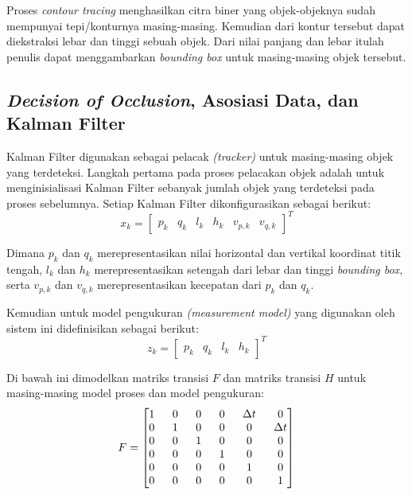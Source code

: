         Proses \textit{contour tracing} menghasilkan citra biner yang objek-objeknya sudah mempunyai tepi/konturnya masing-masing. Kemudian dari kontur tersebut dapat diekstraksi lebar dan tinggi sebuah objek. Dari nilai panjang dan lebar  itulah penulis dapat menggambarkan \textit{bounding box} untuk masing-masing objek tersebut.
        
    \subsection{\textit{Decision of Occlusion}, Asosiasi Data, dan Kalman Filter }
        Kalman Filter digunakan sebagai pelacak \textit{(tracker)} untuk masing-masing objek yang terdeteksi. Langkah pertama pada proses pelacakan objek adalah untuk menginisialisasi Kalman Filter sebanyak jumlah objek yang terdeteksi pada proses sebelumnya. Setiap Kalman Filter dikonfigurasikan sebagai berikut:
        \begin{equation}\label{eq:3.1}
        x_k = 
        \begin{bmatrix}
        p_k & q_k & l_k & h_k & v_{p, k} & v_{q, k}
        \end{bmatrix}^T
        \end{equation}
        
        Dimana $p_{k}$ dan $q_{k}$ merepresentasikan nilai horizontal dan vertikal koordinat titik tengah, $l_k$ dan $h_k$ merepresentasikan setengah dari lebar dan tinggi \textit{bounding box}, serta $v_{p, k}$ dan $v_{q, k}$ merepresentasikan kecepatan dari $p_{k}$ dan $q_{k}$.
        
        Kemudian untuk model pengukuran \textit{(measurement model)} yang digunakan oleh sistem ini didefinisikan sebagai berikut:
        \begin{equation}\label{eq:3.2}
        z_k = 
        \begin{bmatrix}
        p_k & q_k & l_k & h_k
        \end{bmatrix}^T
        \end{equation}
        
        Di bawah ini dimodelkan matriks transisi $F$ dan matriks transisi $H$ untuk masing-masing model proses dan model pengukuran:
        \begin{equation}\label{eq:3.3}
        F = 
        \renewcommand{\arraystretch}{1}
        \setlength\arraycolsep{8pt}
        \begin{bmatrix}
        1 & 0 & 0 & 0 & \Delta{t} & 0\\
        0 & 1 & 0 & 0 & 0 & \Delta{t}\\
        0 & 0 & 1 & 0 & 0 & 0\\
        0 & 0 & 0 & 1 & 0 & 0\\
        0 & 0 & 0 & 0 & 1 & 0\\
        0 & 0 & 0 & 0 & 0 & 1
        \end{bmatrix}
        \end{equation}
        

